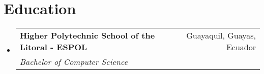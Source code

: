 \documentclass[a4paper,11pt]{article}
\makeatletter
\newcommand{\resumeItem}[1]{
  \item\small{#1}
}
\newcommand{\resumeItemListStart}{\begin{itemize}[rightmargin=0.11in]}
\newcommand{\resumeItemListEnd}{\end{itemize}}
\newcommand{\resumeQuadHeading}[4]{
  \item
  \begin{tabular*}{0.96\textwidth}[t]{l@{\extracolsep{\fill}}r}
    \textbf{#1} & #2 \\
    \textit{\small#3} & \textit{\small #4} \\
  \end{tabular*}
}
\newcommand{\resumeHeadingListStart}{
  \begin{itemize}[leftmargin=0.15in, label={}]
}
\newcommand{\resumeHeadingListEnd}{\end{itemize}}
\makeatother
\begin{document}

\section{Education}
  \resumeHeadingListStart{}
    \resumeQuadHeading{Higher Polytechnic School of the Litoral - ESPOL}{Guayaquil, Guayas, Ecuador}
    {Bachelor of Computer Science}{}
  \resumeHeadingListEnd{}



  
\end{document}
